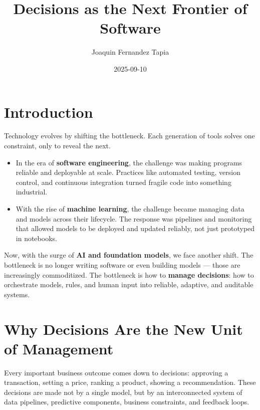 \documentclass[
  letterpaper,
  DIV=11,
  numbers=noendperiod]{scrartcl}
\title{Decisions as the Next Frontier of Software}
\author{Joaquin Fernandez Tapia}
\date{2025-09-10}
\providecommand{\tightlist}{%
  \setlength{\itemsep}{0pt}\setlength{\parskip}{0pt}}
\renewcommand*\contentsname{Table of contents}
\newcommand\contentsname{Table of contents}
\begin{document}
\maketitle

\renewcommand*\contentsname{Table of contents}
{
\hypersetup{linkcolor=}
\setcounter{tocdepth}{3}
\tableofcontents
}

\section{Introduction}\label{introduction}

Technology evolves by shifting the bottleneck. Each generation of tools
solves one constraint, only to reveal the next.

\begin{itemize}
\tightlist
\item
  In the era of \textbf{software engineering}, the challenge was making
  programs reliable and deployable at scale. Practices like automated
  testing, version control, and continuous integration turned fragile
  code into something industrial.\\
\item
  With the rise of \textbf{machine learning}, the challenge became
  managing data and models across their lifecycle. The response was
  pipelines and monitoring that allowed models to be deployed and
  updated reliably, not just prototyped in notebooks.
\end{itemize}

Now, with the surge of \textbf{AI and foundation models}, we face
another shift. The bottleneck is no longer writing software or even
building models --- those are increasingly commoditized. The bottleneck
is how to \textbf{manage decisions}: how to orchestrate models, rules,
and human input into reliable, adaptive, and auditable systems.

\section{Why Decisions Are the New Unit of
Management}\label{why-decisions-are-the-new-unit-of-management}

Every important business outcome comes down to decisions: approving a
transaction, setting a price, ranking a product, showing a
recommendation. These decisions are made not by a single model, but by
an interconnected system of data pipelines, predictive components,
business constraints, and feedback loops.
\end{document}
